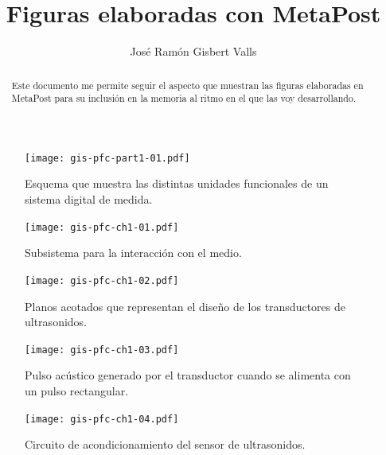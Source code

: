 \documentclass[a4paper,12pt]				{article}
\title{Figuras elaboradas con MetaPost}
\author{José Ramón Gisbert Valls}
\begin{document}
\maketitle{}

\begin{abstract}
	Este documento me permite seguir el aspecto que muestran las
	figuras elaboradas en MetaPost para su inclusión en la memoria al
	ritmo en el que las voy desarrollando.
\end{abstract}

\listoffigures

\begin{figure}
	\begin{center}
		\texttt{[image: gis-pfc-part1-01.pdf]}
	\end{center}
	\caption[Sistema digital de medida]{Esquema que muestra las
	distintas unidades funcionales de un sistema digital de medida.}
	\label{fig:digmeasstm}
\end{figure}

\begin{figure}
	\begin{center}
		\texttt{[image: gis-pfc-ch1-01.pdf]}
	\end{center}
	\caption[Subsistema para la interacción con el medio]{Subsistema
	para la interacción con el medio.}
	\label{fig:submedium}
\end{figure}

\begin{figure}
	\begin{center}
		\texttt{[image: gis-pfc-ch1-02.pdf]}
	\end{center}
	\caption[Transductores de ultrasonidos]{Planos acotados que
	representan el diseño de los transductores de ultrasonidos.}
	\label{fig:transducers}
\end{figure}

\begin{figure}
	\begin{center}
		\texttt{[image: gis-pfc-ch1-03.pdf]}
	\end{center}
	\caption[Pulso acústico generado por el transductor]{Pulso acústico
	generado por el transductor cuando se alimenta con un pulso
	rectangular.}
	\label{fig:pulse}
\end{figure}

\clearpage

\begin{figure}
	\begin{center}
		\texttt{[image: gis-pfc-ch1-04.pdf]}
	\end{center}
	\caption[Circuito de acondicionamiento del sensor
	piezoeléctrico]{Circuito de acondicionamiento del sensor de
	ultrasonidos.}
	\label{fig:rxconditioner}
\end{figure}
\end{document}
